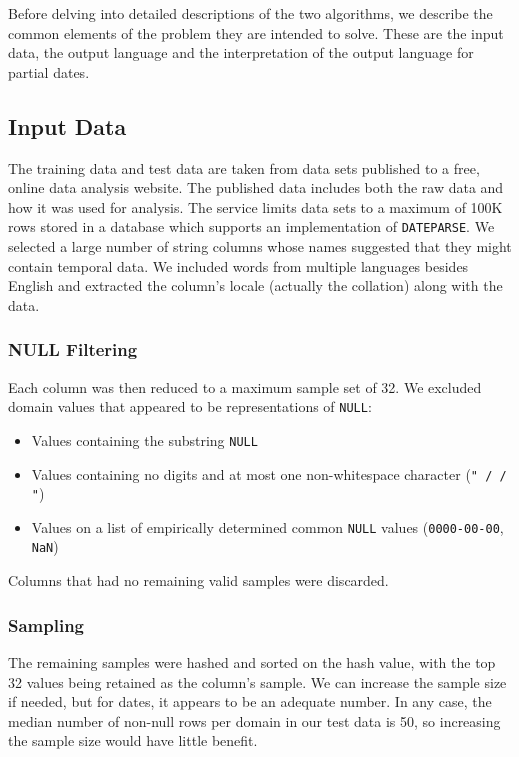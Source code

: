 Before delving into detailed descriptions of the two algorithms, we describe the common elements of the problem they are intended to solve. These are the input data, the output language and the interpretation of the output language for partial dates.

\subsection{Input Data}
The training data and test data are taken from data sets published to a free, online data analysis website. The published data includes both the raw data and how it was used for analysis. The service limits data sets to a maximum of 100K rows stored in a database which supports an implementation of \texttt{DATEPARSE}.  We selected a large number of string columns whose names suggested that they might contain temporal data. We included words from multiple languages besides English and extracted the column's locale (actually the collation) along with the data.

\subsubsection{NULL Filtering}
Each column was then reduced to a maximum sample set of 32. We excluded domain values that appeared to be representations of \texttt{NULL}:
\begin{itemize}
\item Values containing the substring \texttt{NULL}
\item Values containing no digits and at most one non-whitespace character (\eg \texttt{" / / "})
\item Values on a list of empirically determined common \texttt{NULL} values (\eg \texttt{0000-00-00}, \texttt{NaN})
\end{itemize}
Columns that had no remaining valid samples were discarded. 

\subsubsection{Sampling}
The remaining samples were hashed and sorted on the hash value, with the top 32 values being retained as the column's sample. We can increase the sample size if needed, but for dates, it appears to be an adequate number. In any case, the median number of non-null rows per domain in our test data is 50, so increasing the sample size would have little benefit.

